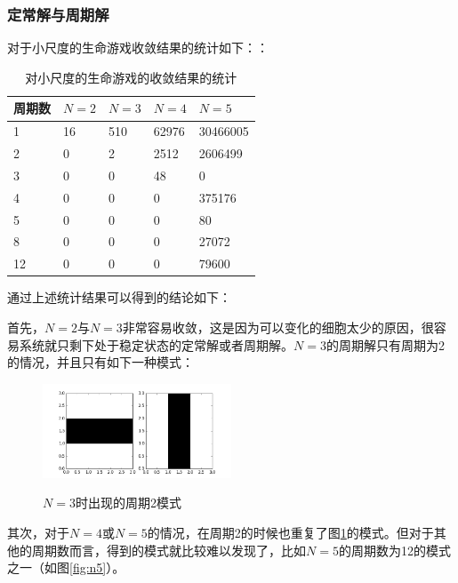 \documentclass[a4paper,12pt]{article}
\begin{document}
\subsubsection{定常解与周期解}

对于小尺度的生命游戏收敛结果的统计如下：：
\begin{table}[!ht]
\centering
\begin{tabular}{|l|l|l|l|l|}
	\hline
	周期数 & $N=2$ & $N=3$ & $N=4$ & $N=5$    \\ \hline
	1   & 16    & 510   & 62976 & 30466005 \\ \hline
	2   & 0     & 2     & 2512  & 2606499  \\ \hline
	3   & 0     & 0     & 48    & 0        \\ \hline
	4   & 0     & 0     & 0     & 375176   \\ \hline
	5   & 0     & 0     & 0     & 80       \\ \hline
	8   & 0     & 0     & 0     & 27072    \\ \hline
	12  & 0     & 0     & 0     & 79600    \\ \hline
\end{tabular}
\label{table:stats}
\caption{对小尺度的生命游戏的收敛结果的统计}
\end{table}

通过上述统计结果可以得到的结论如下：

首先，$N=2$与$N=3$非常容易收敛，这是因为可以变化的细胞太少的原因，很容易系统就只剩下处于稳定状态的定常解或者周期解。$N=3$的周期解只有周期为2的情况，并且只有如下一种模式：

\begin{figure}[!ht]
\centering
\includegraphics[width=0.5\textwidth]{images/img32.png}
\label{fig:n3}
\caption{$N=3$时出现的周期2模式}
\end{figure}

其次，对于$N=4$或$N=5$的情况，在周期2的时候也重复了图\ref{fig:n3}的模式。但对于其他的周期数而言，得到的模式就比较难以发现了，比如$N=5$的周期数为12的模式之一（如图\ref{fig:n5}）。
\end{document}
